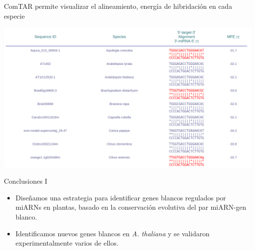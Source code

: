 \documentclass{beamer}
\begin{document}
\begin{frame}{ComTAR permite visualizar el alineamiento, energía de hibridación en cada especie}
	\begin{center}
		\includegraphics[width=.7\textwidth]{img/comTAR_fig2.png}
	\end{center}
\end{frame}

\begin{frame}{Conclusiones I}
	\begin{itemize}
        \item<1-> Diseñamos una estrategia para identificar genes blancos regulados por miARNs en plantas, basado en la conservación evolutiva del par miARN-gen blanco.
        \item<2-> Identificamos nuevos genes blancos en \textit{A. thaliana} y se validaron experimentalmente varios de ellos.
	\end{itemize}
\end{frame}
\end{document}
